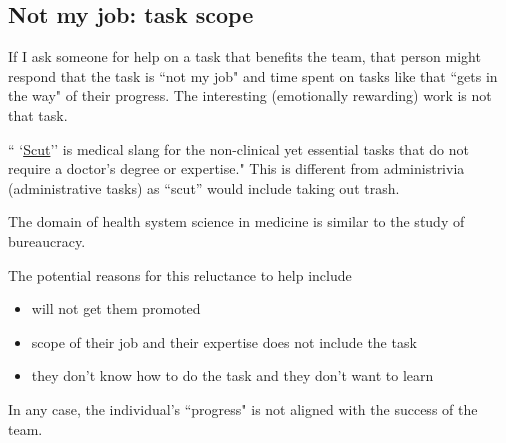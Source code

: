 \subsection{Not my job: task scope}


If I ask someone for help on a task that benefits the team, that person might respond that the task is ``not my job" and time spent on tasks like that ``gets in the way" of their progress. The interesting (emotionally rewarding) work is not that task.

`` `\href{https://www.urbandictionary.com/define.php?term=scut}{Scut}'' is medical slang for the non-clinical yet essential tasks that do not require a doctor's degree or expertise."
This is different from administrivia (administrative tasks) as ``scut'' would include taking out trash. 

The domain of health system science in medicine is similar to the study of bureaucracy. 

The potential reasons for this reluctance to help include
\begin{itemize}
    \item will not get them promoted
    \item scope of their job and their expertise does not include the task
    \item they don't know how to do the task and they don't want to learn
\end{itemize}
In any case, the individual's ``progress" is not aligned with the success of the team.